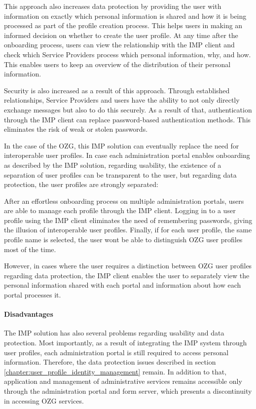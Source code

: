 This approach also increases data protection by providing the user with information on exactly which personal information is shared and how it is being processed as part of the profile creation process. This helps users in making an informed decision on whether to create the user profile. At any time after the onboarding process, users can view the relationship with the IMP client and check which Service Providers process which personal information, why, and how. This enables users to keep an overview of the distribution of their personal information.

Security is also increased as a result of this approach. Through established relationships, Service Providers and users have the ability to not only directly exchange messages but also to do this securely. As a result of that, authentication through the IMP client can replace password-based authentication methods. This eliminates the risk of weak or stolen passwords.

In the case of the OZG, this IMP solution can eventually replace the need for interoperable user profiles. In case each administration portal enables onboarding as described by the IMP solution, regarding usability, the existence of a separation of user profiles can be transparent to the user, but regarding data protection, the user profiles are strongly separated:

After an effortless onboarding process on multiple administration portals, users are able to manage each profile through the IMP client. Logging in to a user profile using the IMP client eliminates the need of remembering passwords, giving the illusion of interoperable user profiles. Finally, if for each user profile, the same profile name is selected, the user wont be able to distinguish OZG user profiles most of the time.

However, in cases where the user requires a distinction between OZG user profiles regarding data protection, the IMP client enables the user to separately view the personal information shared with each portal and information about how each portal processes it.

\paragraph{Disadvantages}

The IMP solution has also several problems regarding usability and data protection. Most importantly, as a result of integrating the IMP system through user profiles, each administration portal is still required to access personal information. Therefore, the data protection issues described in section \ref{chapter:user_profile_identity_management} remain. In addition to that, application and management of administrative services remains accessible only through the administration portal and form server, which presents a discontinuity in accessing OZG services.
